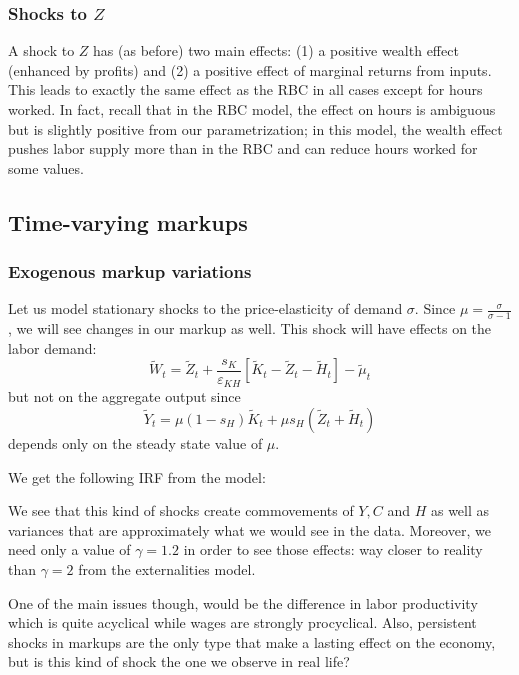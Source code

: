 \documentclass[12pt]{report}
\begin{document}
\subsubsection{Shocks to $Z$}

A shock to $Z$ has (as before) two main effects: (1) a positive wealth effect (enhanced by profits) and (2) a positive effect of marginal returns from inputs. This leads to exactly the same effect as the RBC in all cases except for hours worked. In fact, recall that in the RBC model, the effect on hours is ambiguous but is slightly positive from our parametrization; in this model, the wealth effect pushes labor supply more than in the RBC and can reduce hours worked for some values.



\subsection{Time-varying markups}

\subsubsection{Exogenous markup variations}

Let us model stationary shocks to the price-elasticity of demand $\sigma$. Since $\mu = \frac{\sigma}{\sigma - 1}$, we will see changes in our markup as well. This shock will have effects on the labor demand: $$\tilde{W}_t = \tilde Z_t + \frac{s_K}{\varepsilon_{KH}}[\tilde K_t - \tilde Z_t - \tilde H_t] - \tilde \mu_t$$ but not on the aggregate output since $$\tilde Y_t = \mu(1 -s_{H})\tilde{K}_t + \mu s_H(\tilde{Z}_t + \tilde{H}_t) $$ depends only on the steady state value of $\mu$.

We get the following IRF from the model:


We see that this kind of shocks create commovements of $Y, C$ and $H$ as well as variances that are approximately what we would see in the data. Moreover, we need only a value of $\gamma = 1.2$ in order to see those effects: way closer to reality than $\gamma = 2$ from the externalities model.

One of the main issues though, would be the difference in labor productivity which is quite acyclical while wages are strongly procyclical. Also, persistent shocks in markups are the only type that make a lasting effect on the economy, but is this kind of shock the one we observe in real life?
\end{document}
